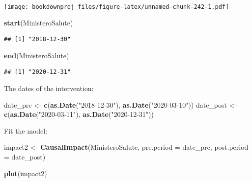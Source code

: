 \documentclass[
]{article}
\newenvironment{Shaded}{\begin{snugshade}}{\end{snugshade}}
\newcommand{\DataTypeTok}[1]{\textcolor[rgb]{0.13,0.29,0.53}{#1}}
\newcommand{\KeywordTok}[1]{\textcolor[rgb]{0.13,0.29,0.53}{\textbf{#1}}}
\newcommand{\NormalTok}[1]{#1}
\newcommand{\StringTok}[1]{\textcolor[rgb]{0.31,0.60,0.02}{#1}}
\begin{document}
\texttt{[image: bookdownproj\_files/figure-latex/unnamed-chunk-242-1.pdf]}

\begin{Shaded}
\begin{Highlighting}[]
\KeywordTok{start}\NormalTok{(MinisteroSalute)}
\end{Highlighting}
\end{Shaded}

\begin{verbatim}
## [1] "2018-12-30"
\end{verbatim}

\begin{Shaded}
\begin{Highlighting}[]
\KeywordTok{end}\NormalTok{(MinisteroSalute)}
\end{Highlighting}
\end{Shaded}

\begin{verbatim}
## [1] "2020-12-31"
\end{verbatim}

The dates of the intervention:

\begin{Shaded}
\begin{Highlighting}[]
\NormalTok{date_pre <-}\StringTok{  }\KeywordTok{c}\NormalTok{(}\KeywordTok{as.Date}\NormalTok{(}\StringTok{"2018-12-30"}\NormalTok{), }\KeywordTok{as.Date}\NormalTok{(}\StringTok{"2020-03-10"}\NormalTok{))}
\NormalTok{date_post <-}\StringTok{  }\KeywordTok{c}\NormalTok{(}\KeywordTok{as.Date}\NormalTok{(}\StringTok{"2020-03-11"}\NormalTok{), }\KeywordTok{as.Date}\NormalTok{(}\StringTok{"2020-12-31"}\NormalTok{))}
\end{Highlighting}
\end{Shaded}

Fit the model:

\begin{Shaded}
\begin{Highlighting}[]
\NormalTok{impact2 <-}\StringTok{ }\KeywordTok{CausalImpact}\NormalTok{(MinisteroSalute, }
                       \DataTypeTok{pre.period =}\NormalTok{  date_pre, }
                       \DataTypeTok{post.period =}\NormalTok{ date_post)}
\end{Highlighting}
\end{Shaded}

\begin{Shaded}
\begin{Highlighting}[]
\KeywordTok{plot}\NormalTok{(impact2)}
\end{Highlighting}
\end{Shaded}
\end{document}
